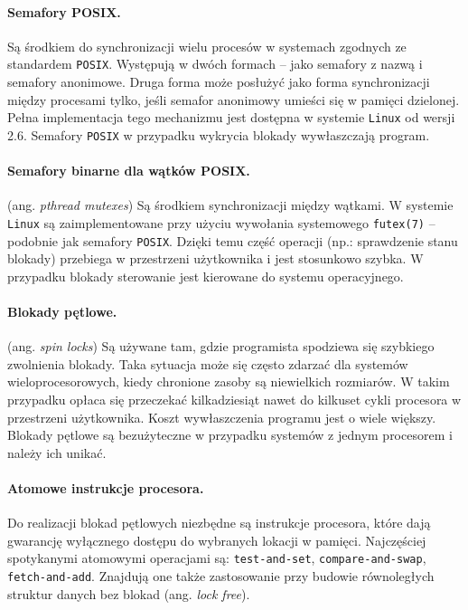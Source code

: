\documentclass[12pt,a4paper,titlepage,twoside]{mwart}
\begin{document}
\paragraph{Semafory POSIX.} Są środkiem do synchronizacji wielu procesów w
systemach zgodnych ze standardem \texttt{POSIX}. Występują w dwóch formach --
jako semafory z nazwą i semafory anonimowe. Druga forma może posłużyć jako
forma synchronizacji między procesami tylko, jeśli semafor anonimowy umieści
się w pamięci dzielonej. Pełna implementacja tego mechanizmu jest dostępna w
systemie \texttt{Linux} od wersji 2.6. Semafory \texttt{POSIX} w przypadku
wykrycia blokady wywłaszczają program.

\paragraph{Semafory binarne dla wątków POSIX.} (ang. \textit{pthread mutexes})
Są środkiem synchronizacji między wątkami. W systemie \texttt{Linux} są
zaimplementowane przy użyciu wywołania systemowego \verb+futex(7)+ -- podobnie
jak semafory \texttt{POSIX}. Dzięki temu część operacji (np.: sprawdzenie stanu
blokady) przebiega w przestrzeni użytkownika i jest stosunkowo szybka. W
przypadku blokady sterowanie jest kierowane do systemu operacyjnego. 

\paragraph{Blokady pętlowe.} (ang. \textit{spin locks}) Są używane tam, gdzie
programista spodziewa się szybkiego zwolnienia blokady. Taka sytuacja może się
często zdarzać dla systemów wieloprocesorowych, kiedy chronione zasoby są
niewielkich rozmiarów. W takim przypadku opłaca się przeczekać kilkadziesiąt
nawet do kilkuset cykli procesora w przestrzeni użytkownika. Koszt
wywłaszczenia programu jest o wiele większy. Blokady pętlowe są bezużyteczne w
przypadku systemów z jednym procesorem i należy ich unikać.

\paragraph{Atomowe instrukcje procesora.} Do realizacji blokad pętlowych
niezbędne są instrukcje procesora, które dają gwarancję wyłącznego dostępu do
wybranych lokacji w pamięci. Najczęściej spotykanymi atomowymi operacjami są:
\texttt{test-and-set}, \texttt{compare-and-swap}, \texttt{fetch-and-add}.
Znajdują one także zastosowanie przy budowie równoległych struktur danych bez
blokad (ang. \textit{lock free}).
\end{document}
